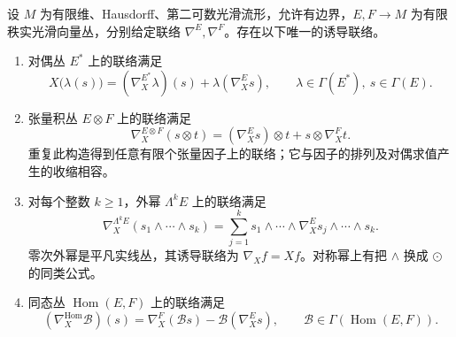 \begin{proposition}\label{g1:prop:induced-connections}
	设 \(M\) 为有限维、Hausdorff、第二可数光滑流形，允许有边界，\(E,F\to M\) 为有限秩实光滑向量丛，分别给定联络 \(\nabla^E,\nabla^F\)。存在以下唯一的诱导联络。
	\begin{enumerate}
		\item 对偶丛 \(E^*\) 上的联络满足
		\[
			X\bigl(\lambda(s)\bigr)=(\nabla^{E^*}_X\lambda)(s)+\lambda(\nabla^E_Xs),
			\qquad \lambda\in\Gamma(E^*),\ s\in\Gamma(E).
		\]
		\item 张量积丛 \(E\otimes F\) 上的联络满足
		\[
			\nabla^{E\otimes F}_X(s\otimes t)
			=(\nabla^E_Xs)\otimes t+s\otimes\nabla^F_Xt.
		\]
		重复此构造得到任意有限个张量因子上的联络；它与因子的排列及对偶求值产生的收缩相容。
		\item 对每个整数 \(k\geq1\)，外幂 \(\Lambda^kE\) 上的联络满足
		\[
			\nabla^{\Lambda^kE}_X(s_1\wedge\cdots\wedge s_k)
			=\sum_{j=1}^k s_1\wedge\cdots\wedge\nabla^E_Xs_j\wedge\cdots\wedge s_k.
		\]
		零次外幂是平凡实线丛，其诱导联络为 \(\nabla_Xf=Xf\)。对称幂上有把 \(\wedge\) 换成 \(\odot\) 的同类公式。
		\item 同态丛 \(\operatorname{Hom}(E,F)\) 上的联络满足
		\[
			(\nabla^{\operatorname{Hom}}_X\mathcal B)(s)
			=\nabla^F_X(\mathcal B s)-\mathcal B(\nabla^E_Xs),
			\qquad \mathcal B\in\Gamma(\operatorname{Hom}(E,F)).
		\]
	\end{enumerate}
\end{proposition}
